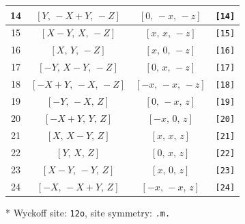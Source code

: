 \documentclass[fleqn,8pt]{jsarticle}
\begin{document}
\begin{longtable}{cccc}
14 & $\left[ Y,\, - X + Y,\, - Z \right]$ & $\left[ 0,\, - x,\, - z \right]$ & {\tt [14]} \\ \hline
15 & $\left[ X - Y,\, X,\, - Z \right]$ & $\left[ x,\, x,\, - z \right]$ & {\tt [15]} \\ \hline
16 & $\left[ X,\, Y,\, - Z \right]$ & $\left[ x,\, 0,\, - z \right]$ & {\tt [16]} \\ \hline
17 & $\left[ - Y,\, X - Y,\, - Z \right]$ & $\left[ 0,\, x,\, - z \right]$ & {\tt [17]} \\ \hline
18 & $\left[ - X + Y,\, - X,\, - Z \right]$ & $\left[ - x,\, - x,\, - z \right]$ & {\tt [18]} \\ \hline
19 & $\left[ - Y,\, - X,\, Z \right]$ & $\left[ 0,\, - x,\, z \right]$ & {\tt [19]} \\ \hline
20 & $\left[ - X + Y,\, Y,\, Z \right]$ & $\left[ - x,\, 0,\, z \right]$ & {\tt [20]} \\ \hline
21 & $\left[ X,\, X - Y,\, Z \right]$ & $\left[ x,\, x,\, z \right]$ & {\tt [21]} \\ \hline
22 & $\left[ Y,\, X,\, Z \right]$ & $\left[ 0,\, x,\, z \right]$ & {\tt [22]} \\ \hline
23 & $\left[ X - Y,\, - Y,\, Z \right]$ & $\left[ x,\, 0,\, z \right]$ & {\tt [23]} \\ \hline
24 & $\left[ - X,\, - X + Y,\, Z \right]$ & $\left[ - x,\, - x,\, z \right]$ & {\tt [24]} \\
\end{longtable}
* Wyckoff site: {\tt 12o}, site symmetry: {\tt .m.}
\renewcommand{\arraystretch}{1.2}
\end{document}
